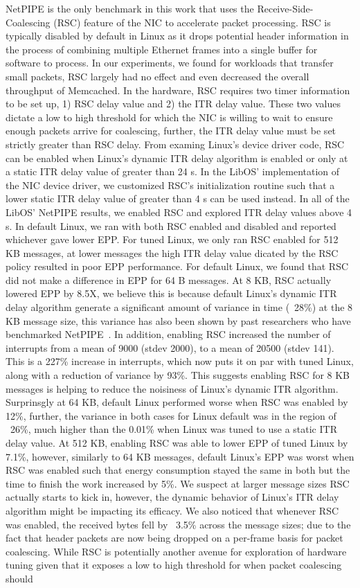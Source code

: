 NetPIPE is the only benchmark in this work that uses the Receive-Side-Coalescing (RSC) feature of the NIC to accelerate packet processing. RSC is typically disabled by default in Linux as it drops potential header information in the process of combining multiple Ethernet frames into a single buffer for software to process. In our experiments, we found for workloads that transfer small packets, RSC largely had no effect and even decreased the overall throughput of Memcached. In the hardware, RSC requires two timer information to be set up, 1)  RSC delay value and 2) the ITR delay value. These two values dictate a low to high threshold for which the NIC is willing to wait to ensure enough packets arrive for coalescing, further, the ITR delay value must be set strictly greater than RSC delay. From examing Linux's device driver code, RSC can be enabled when Linux's dynamic ITR delay algorithm is enabled or only at a static ITR delay value of greater than 24 \micro s. In the LibOS' implementation of the NIC device driver, we customized RSC's initialization routine such that a lower static ITR delay value of greater than 4 \micro s can be used instead. In all of the LibOS' NetPIPE results, we enabled RSC and explored ITR delay values above 4 \micro s. In default Linux, we ran with both RSC enabled and disabled and reported whichever gave lower EPP. For tuned Linux, we only ran RSC enabled for 512 KB messages, at lower messages the high ITR delay value dicated by the RSC policy resulted in poor EPP performance. For default Linux, we found that RSC did not make a difference in EPP for 64 B messages. At 8 KB, RSC actually lowered EPP by 8.5X, we believe this is because default Linux's dynamic ITR delay algorithm generate a significant amount of variance in time (~28\%) at the 8 KB message size, this variance has also been shown by past researchers who have benchmarked NetPIPE~\cite{ix, ebbrt}. In addition, enabling RSC increased the number of interrupts from a mean of 9000 (stdev 2000), to a mean of 20500 (stdev 141). This is a 227\% increase in interrupts, which now puts it on par with tuned Linux, along with a reduction of variance by 93\%. This suggests enabling RSC for 8 KB messages is helping to reduce the noisiness of Linux's dynamic ITR algorithm. Surprinsgly at 64 KB, default Linux performed worse when RSC was enabled by 12\%, further, the variance in both cases for Linux default was in the region of ~26\%, much higher than the 0.01\% when Linux was tuned to use a static ITR delay value. At 512 KB, enabling RSC was able to lower EPP of tuned Linux by 7.1\%, however, similarly to 64 KB messages, default Linux's EPP was worst when RSC was enabled such that energy consumption stayed the same in both but the time to finish the work increased by 5\%. We suspect at larger message sizes RSC actually starts to kick in, however, the dynamic behavior of Linux's ITR delay algorithm might be impacting its efficacy. We also noticed that whenever RSC was enabled, the received bytes fell by ~3.5\% across the message sizes; due to the fact that header packets are now being dropped on a per-frame basis for packet coalescing. While RSC is potentially another avenue for exploration of hardware tuning given that it exposes a low to high threshold for when packet coalescing should 